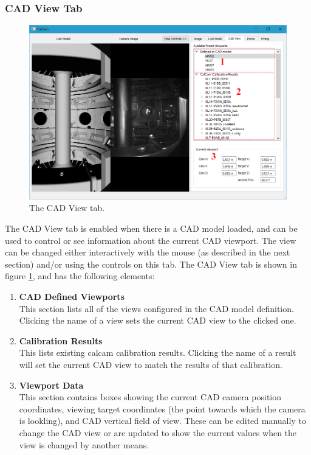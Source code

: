 \documentclass[12pt]{article}
\begin{document}
\subsubsection{CAD View Tab}
\begin{figure}[htb]
\includegraphics[width=\textwidth]{cad_view_tab.PNG}
\caption{\label{fig:cad_view_tab}The CAD View tab.}
\end{figure}
The CAD View tab is enabled when there is a CAD model loaded, and can be used to control or see information about the current CAD viewport. The view can be changed either interactively with the mouse (as described in the next section) and/or using the controls on this tab. The CAD View tab is shown in figure \ref{fig:cad_view_tab}, and has the following elements:

\begin{enumerate}
\item{\textbf{CAD Defined Viewports}\\This section lists all of the views configured in the CAD model definition. Clicking the name of a view sets the current CAD view to the clicked one.}
\item{\textbf{Calibration Results}\\This lists existing calcam calibration results. Clicking the name of a result will set the current CAD view to match the results of that calibration.}
\item{\textbf{Viewport Data}\\This section contains boxes showing the current CAD camera position coordinates, viewing target coordinates (the point towards which the camera is lookling), and CAD vertical field of view. These can be edited manually to change the CAD view or are updated to show the current values when the view is changed by another means.}
\end{enumerate}
\end{document}
